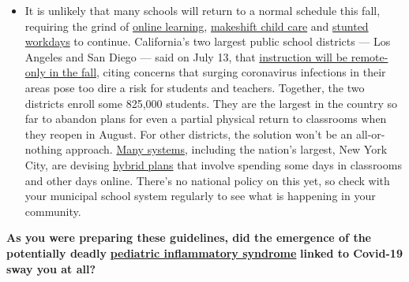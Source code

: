 \begin{itemize}
  \begin{itemize}
  \tightlist
  \item
    It is unlikely that many schools will return to a normal schedule
    this fall, requiring the grind of
    \href{https://www.nytimes3xbfgragh.onion/2020/06/05/us/coronavirus-education-lost-learning.html?action=click\&pgtype=Article\&state=default\&region=MAIN_CONTENT_3\&context=storylines_faq}{online
    learning},
    \href{https://www.nytimes3xbfgragh.onion/2020/05/29/us/coronavirus-child-care-centers.html?action=click\&pgtype=Article\&state=default\&region=MAIN_CONTENT_3\&context=storylines_faq}{makeshift
    child care} and
    \href{https://www.nytimes3xbfgragh.onion/2020/06/03/business/economy/coronavirus-working-women.html?action=click\&pgtype=Article\&state=default\&region=MAIN_CONTENT_3\&context=storylines_faq}{stunted
    workdays} to continue. California's two largest public school
    districts --- Los Angeles and San Diego --- said on July 13, that
    \href{https://www.nytimes3xbfgragh.onion/2020/07/13/us/lausd-san-diego-school-reopening.html?action=click\&pgtype=Article\&state=default\&region=MAIN_CONTENT_3\&context=storylines_faq}{instruction
    will be remote-only in the fall}, citing concerns that surging
    coronavirus infections in their areas pose too dire a risk for
    students and teachers. Together, the two districts enroll some
    825,000 students. They are the largest in the country so far to
    abandon plans for even a partial physical return to classrooms when
    they reopen in August. For other districts, the solution won't be an
    all-or-nothing approach.
    \href{https://bioethics.jhu.edu/research-and-outreach/projects/eschool-initiative/school-policy-tracker/}{Many
    systems}, including the nation's largest, New York City, are
    devising
    \href{https://www.nytimes3xbfgragh.onion/2020/06/26/us/coronavirus-schools-reopen-fall.html?action=click\&pgtype=Article\&state=default\&region=MAIN_CONTENT_3\&context=storylines_faq}{hybrid
    plans} that involve spending some days in classrooms and other days
    online. There's no national policy on this yet, so check with your
    municipal school system regularly to see what is happening in your
    community.
  \end{itemize}
\end{itemize}

\textbf{As you were preparing these guidelines, did the emergence of the
potentially deadly}
\textbf{\href{https://www.nytimes3xbfgragh.onion/2020/06/29/well/family/caring-for-children-with-multisystem-inflammatory-syndrome.html}{pediatric
inflammatory syndrome}} \textbf{linked to Covid-19 sway you at all?}

